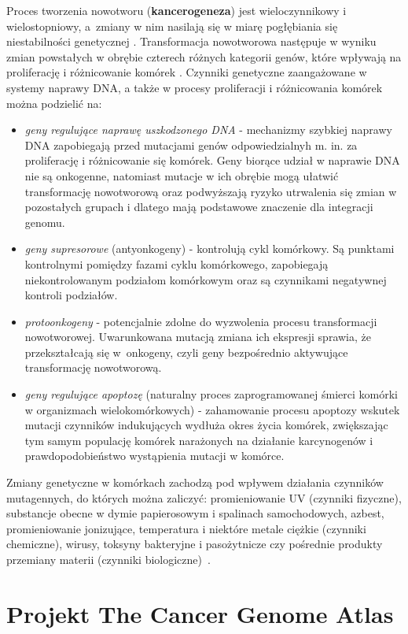 Proces tworzenia nowotworu (\textbf{kancerogeneza}) jest wieloczynnikowy i wielostopniowy, a~zmiany w nim nasilają się w miarę pogłębiania się niestabilności genetycznej \cite{zikula2}. Transformacja nowotworowa następuje w wyniku zmian powstałych w obrębie czterech różnych kategorii genów, które wpływają na proliferację i różnicowanie komórek \cite{zikula}. Czynniki genetyczne zaangażowane w systemy naprawy DNA, a także w procesy proliferacji i różnicowania komórek \cite{zikula4} można podzielić na:  
\begin{itemize}
\item \textit{geny regulujące naprawę uszkodzonego DNA} - mechanizmy szybkiej naprawy DNA zapobiegają przed mutacjami genów odpowiedzialnyh m. in. za proliferację i różnicowanie się komórek. Geny biorące udział w naprawie DNA nie są onkogenne, natomiast mutacje w ich obrębie mogą ułatwić transformację nowotworową oraz podwyższają ryzyko utrwalenia się zmian w pozostałych grupach i dlatego mają podstawowe znaczenie dla integracji genomu.
\item \textit{geny supresorowe} (antyonkogeny) - kontrolują cykl komórkowy. Są punktami kontrolnymi pomiędzy fazami cyklu komórkowego, zapobiegają niekontrolowanym podziałom komórkowym oraz są czynnikami negatywnej kontroli podziałów.
\item \textit{protoonkogeny} - potencjalnie zdolne do wyzwolenia procesu transformacji nowotworowej. Uwarunkowana mutacją zmiana ich ekspresji sprawia, że przekształcają się w~onkogeny, czyli geny bezpośrednio aktywujące transformację nowotworową.
\item \textit{geny regulujące apoptozę} (naturalny proces zaprogramowanej śmierci komórki w organizmach wielokomórkowych) - zahamowanie procesu apoptozy wskutek mutacji czynników indukujących wydłuża okres życia komórek, zwiększając tym samym populację komórek narażonych na działanie karcynogenów i prawdopodobieństwo wystąpienia mutacji w komórce.
\end{itemize}
Zmiany genetyczne w komórkach zachodzą pod wpływem działania czynników mutagennych, do których można zaliczyć: promieniowanie UV (czynniki fizyczne), substancje obecne w dymie papierosowym i spalinach samochodowych, azbest, promieniowanie jonizujące, temperatura i niektóre metale ciężkie (czynniki chemiczne), wirusy, toksyny bakteryjne i pasożytnicze czy pośrednie produkty przemiany materii (czynniki biologiczne)~\cite{zikula3}.


\section{Projekt The Cancer Genome Atlas}\label{chan:TCGA}

